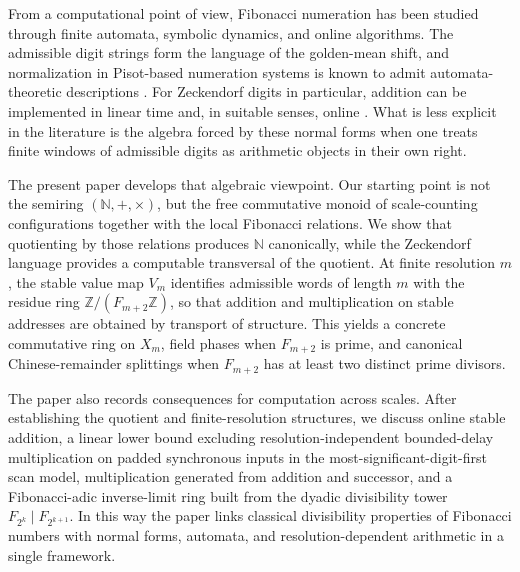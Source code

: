 \documentclass[12pt,a4paper]{article}
\theoremstyle{plain}
\theoremstyle{definition}
\numberwithin{equation}{section}
\newcommand{\ZZ}{\mathbb{Z}}
\newcommand{\NN}{\mathbb{N}}
\begin{document}
From a computational point of view, Fibonacci numeration has been studied through finite automata, symbolic dynamics, and online algorithms. The admissible digit strings form the language of the golden-mean shift, and normalization in Pisot-based numeration systems is known to admit automata-theoretic descriptions \cite{Blanchard1989Beta,AlloucheShallit2003,LindMarcus1995,PytheasFogg2002}. For Zeckendorf digits in particular, addition can be implemented in linear time and, in suitable senses, online \cite{Frougny1999OnlineAddition,AhlbachUsatineFrougnyPippenger2013,HieronymiTerry2018OstrowskiAddition}. What is less explicit in the literature is the algebra forced by these normal forms when one treats finite windows of admissible digits as arithmetic objects in their own right.

The present paper develops that algebraic viewpoint. Our starting point is not the semiring \((\NN,+,\times)\), but the free commutative monoid of scale-counting configurations together with the local Fibonacci relations. We show that quotienting by those relations produces \(\NN\) canonically, while the Zeckendorf language provides a computable transversal of the quotient. At finite resolution \(m\), the stable value map \(V_m\) identifies admissible words of length \(m\) with the residue ring \(\ZZ/(F_{m+2}\ZZ)\), so that addition and multiplication on stable addresses are obtained by transport of structure. This yields a concrete commutative ring on \(X_m\), field phases when \(F_{m+2}\) is prime, and canonical Chinese-remainder splittings when \(F_{m+2}\) has at least two distinct prime divisors.

The paper also records consequences for computation across scales. After establishing the quotient and finite-resolution structures, we discuss online stable addition, a linear lower bound excluding resolution-independent bounded-delay multiplication on padded synchronous inputs in the most-significant-digit-first scan model, multiplication generated from addition and successor, and a Fibonacci-adic inverse-limit ring built from the dyadic divisibility tower \(F_{2^k}\mid F_{2^{k+1}}\). In this way the paper links classical divisibility properties of Fibonacci numbers \cite{Wall1960} with normal forms, automata, and resolution-dependent arithmetic in a single framework.
\end{document}
